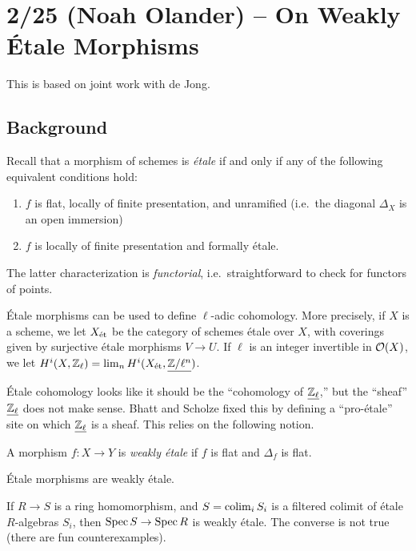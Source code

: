 \documentclass{article}
\begin{document}
\section{2/25 (Noah Olander) -- On Weakly \'Etale Morphisms}

This is based on joint work with de Jong.

\subsection{Background}

Recall that a morphism of schemes is \emph{\'etale} if and only if any of the following equivalent conditions hold:
\begin{enumerate}
	\item $f$ is flat, locally of finite presentation, and unramified (i.e.\ the diagonal $\Delta_X$ is an open immersion)
	\item $f$ is locally of finite presentation and formally \'etale.
\end{enumerate}

\begin{rmk}
	The latter characterization is \emph{functorial}, i.e.\ straightforward to check for functors of points.
\end{rmk}

\'Etale morphisms can be used to define $\ell$-adic cohomology.
More precisely, if $X$ is a scheme, we let $X_{\mathrm{\acute{e}t}}$ be the category of schemes \'etale over $X$, with coverings given by surjective \'etale morphisms $V \to U$.
If $\ell$ is an integer invertible in $\mathcal{O}(X)$, we let $H^i(X, \mathbb{Z}_\ell) = \lim_n H^i(X_{\mathrm{\acute{e}t}}, \underline{\mathbb{Z} / \ell^n})$.

\'Etale cohomology looks like it should be the ``cohomology of $\underline{\mathbb{Z}_\ell}$,'' but the ``sheaf'' $\underline{\mathbb{Z}_\ell}$ does not make sense.
Bhatt and Scholze fixed this by defining a ``pro-\'etale'' site on which $\underline{\mathbb{Z}_\ell}$ is a sheaf.
This relies on the following notion.

\begin{dfn}
	A morphism $f: X \to Y$ is \emph{weakly \'etale} if $f$ is flat and $\Delta_f$ is flat.
\end{dfn}

\begin{ex}
	\'Etale morphisms are weakly \'etale.
\end{ex}

\begin{ex}
	If $R \to S$ is a ring homomorphism, and $S = \operatorname*{colim}_i S_i$ is a filtered colimit of \'etale $R$-algebras $S_i$, then $\operatorname{Spec} S \to \operatorname{Spec} R$ is weakly \'etale.
	The converse is not true (there are fun counterexamples).
\end{ex}
\end{document}
